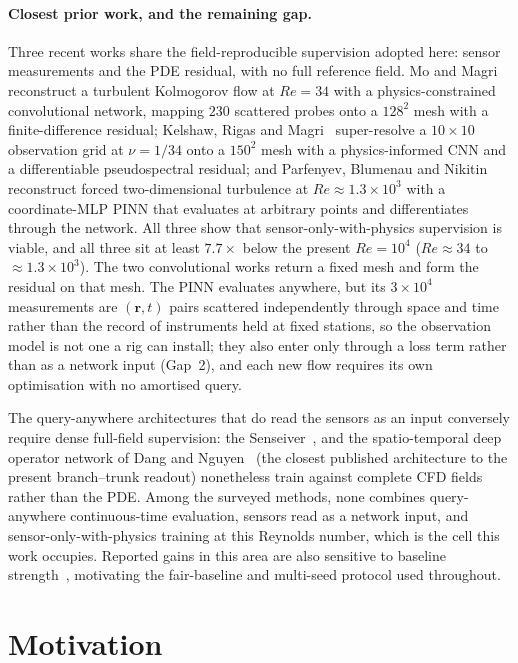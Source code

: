 \paragraph{Closest prior work, and the remaining gap.}
Three recent works share the field-reproducible supervision adopted here: sensor measurements and the PDE residual, with no full reference field. Mo and Magri~\cite{Mo2025PRF} reconstruct a turbulent Kolmogorov flow at $Re=34$ with a physics-constrained convolutional network, mapping $230$ scattered probes onto a $128^2$ mesh with a finite-difference residual; Kelshaw, Rigas and Magri~\cite{Kelshaw2022PISR} super-resolve a $10\times 10$ observation grid at $\nu=1/34$ onto a $150^2$ mesh with a physics-informed CNN and a differentiable pseudospectral residual; and Parfenyev, Blumenau and Nikitin~\cite{Parfenyev2024PINN} reconstruct forced two-dimensional turbulence at $Re\approx1.3\times10^3$ with a coordinate-MLP PINN that evaluates at arbitrary points and differentiates through the network. All three show that sensor-only-with-physics supervision is viable, and all three sit at least $7.7\times$ below the present $Re=10^4$ ($Re\approx34$ to $\approx1.3\times10^3$). The two convolutional works return a fixed mesh and form the residual on that mesh. The PINN evaluates anywhere, but its $3\times10^4$ measurements are $(\mathbf{r},t)$ pairs scattered independently through space and time rather than the record of instruments held at fixed stations, so the observation model is not one a rig can install; they also enter only through a loss term rather than as a network input (Gap~2), and each new flow requires its own optimisation with no amortised query.

The query-anywhere architectures that do read the sensors as an input conversely require dense full-field supervision: the Senseiver~\cite{Senseiver2023}, and the spatio-temporal deep operator network of Dang and Nguyen~\cite{FLRONet2024} (the closest published architecture to the present branch--trunk readout) nonetheless train against complete CFD fields rather than the PDE. Among the surveyed methods, none combines query-anywhere continuous-time evaluation, sensors read as a network input, and sensor-only-with-physics training at this Reynolds number, which is the cell this work occupies. Reported gains in this area are also sensitive to baseline strength~\cite{McGreivy2024}, motivating the fair-baseline and multi-seed protocol used throughout.

\section{Motivation}
\label{sec:gap}


